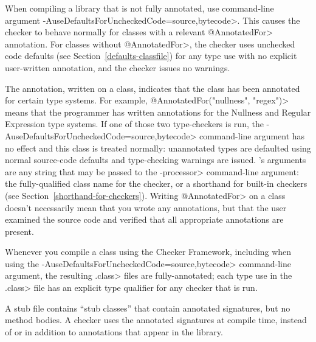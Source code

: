 
\begin{sloppypar}
When compiling a library that is not fully annotated, use command-line
argument \<-AuseDefaultsForUncheckedCode=source,bytecode>.  This causes
the checker to behave normally for classes with a relevant \<@AnnotatedFor>
annotation.  For classes without \<@AnnotatedFor>, the checker uses
unchecked code defaults
(see Section~\ref{defaults-classfile}) for any type use with no explicit
user-written annotation, and the checker issues no warnings.
\end{sloppypar}

The  annotation, written on a
class, indicates that the class has been annotated for certain type
systems.  For example, \<@AnnotatedFor(\ttlcb"nullness", "regex"\ttrcb)> means that
the programmer has written annotations for the Nullness and Regular
Expression type systems.  If one of those two type-checkers is run,
the \<-AuseDefaultsForUncheckedCode=source,bytecode> command-line argument
has no effect and this class is treated normally:
unannotated types are defaulted using normal source-code
defaults and type-checking warnings are issued.
's arguments are any string that
may be passed to the \<-processor> command-line argument:  the
fully-qualified class name for the checker, or a shorthand for built-in
checkers (see Section~\ref{shorthand-for-checkers}).
Writing \<@AnnotatedFor> on a class doesn't necessarily mean that you wrote
any annotations, but that the user examined the source code and verified
that all appropriate annotations are present.

\begin{sloppypar}
Whenever you compile a class using the Checker Framework, including when
using the \<-AuseDefaultsForUncheckedCode=source,bytecode> command-line
argument, the resulting \<.class> files are fully-annotated; each type use
in the \<.class> file has an explicit type qualifier for any checker that
is run.
\end{sloppypar}



A stub file contains ``stub classes'' that contain annotated signatures,
but no method bodies.  A
checker uses the annotated signatures at compile time, instead of or in
addition to annotations that appear in the library.

